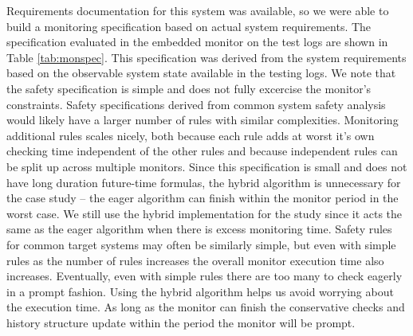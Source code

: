 Requirements documentation for this system was available, so we were able to build a monitoring specification based on actual system requirements.
The specification evaluated in the embedded monitor on the test logs are shown in Table \ref{tab:monspec}. This specification was derived from the system requirements based on the observable system state available in the testing logs. 
We note that the safety specification is simple and does not fully excercise the monitor's constraints. Safety specifications derived from common system safety analysis would likely have a larger number of rules with similar complexities. Monitoring additional rules scales nicely, both because each rule adds at worst it's own checking time independent of the other rules and because independent rules can be split up across multiple monitors.
%
Since this specification is small and does not have long duration future-time formulas, the hybrid algorithm is unnecessary for the case study -- the eager algorithm can finish within the monitor period in the worst case. We still use the hybrid implementation for the study since it acts the same as the eager algorithm when there is excess monitoring time. Safety rules for common target systems may often be similarly simple, but even with simple rules as the number of rules increases the overall monitor execution time also increases. Eventually, even with simple rules there are too many to check eagerly in a prompt fashion. Using the hybrid algorithm helps us avoid worrying about the execution time. As long as the monitor can finish the conservative checks and history structure update within the period the monitor will be prompt.



